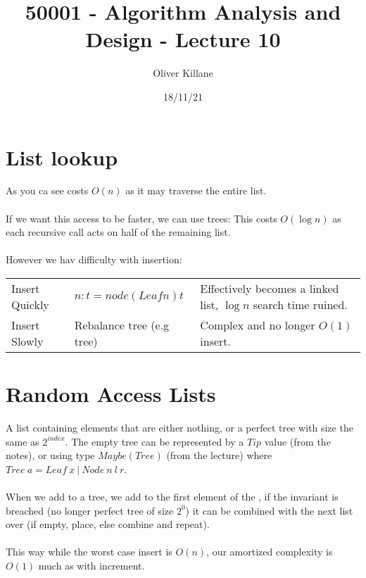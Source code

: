 \documentclass{report}
\title{50001 - Algorithm Analysis and Design - Lecture 10}
\author{Oliver Killane}
\date{18/11/21}
\begin{document}
\maketitle
{}

\section*{List lookup}
As you ca  see \fun{!!} costs $O(n)$ as it may traverse the entire list.
\\
\\ If we want this access to be faster, we can use trees:
This costs $O(\log n)$ as each recursive call acts on half of the remaining list.
\\
\\ However we hav difficulty with insertion:
\begin{center}
	\begin{tabular}{l l l}
		Insert Quickly & $n : t = node (Leaf n) t$               & Effectively becomes a linked list, $\log n$ search time ruined. \\
		Insert Slowly  & Rebalance tree (e.g \keyword{AVL} tree) & Complex and no longer $O(1)$ insert.                            \\
	\end{tabular}
\end{center}

\section*{Random Access Lists}
A list containing elements that are either nothing, or a perfect tree with size the same as $2^{index}$.
The empty tree can be represented by a $Tip$ value (from the notes), or using type $Maybe(Tree)$ (from the lecture) where $Tree \ a = Leaf \ x \ | \ Node \ n \ l \ r$.
\\
\\ When we add to a tree, we add to the first element of the , if the invariant is breached (no longer perfect tree of size $2^0$) it can be combined with the next list over (if empty, place, else combine and repeat).
\\
\\ This way while the worst case insert is $O(n)$, our amortized complexity is $O(1)$ much as with increment.
\end{document}
